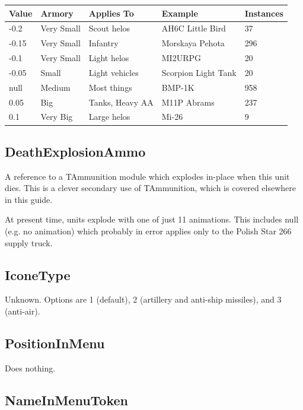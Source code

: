 \documentclass{article}
\begin{document}
\begin{center}
    \begin{tabular}{ | l | l | l | l | l |}
    \hline
	Value & Armory & Applies To & Example & Instances \\ \hline
	-0.2  &  Very Small & Scout helos & AH6C Little Bird  & 37\\
	-0.15 & Very Small & Infantry & Morskaya Pehota & 296 \\
	-0.1 & Very Small & Light helos & MI2URPG & 20 \\
	-0.05 & Small & Light vehicles & Scorpion Light Tank & 20\\
	null & Medium & Most things & BMP-1K & 958 \\
	0.05 & Big & Tanks, Heavy AA & M11P Abrams & 237\\
	0.1 & Very Big & Large helos & Mi-26 & 9\\	
    \hline
    \end{tabular}
\end{center}

\subsection{DeathExplosionAmmo}

A reference to a TAmmunition module which explodes in-place when this unit dies. This is a clever secondary use of TAmmunition, which is covered elsewhere in this guide.

At present time, units explode with one of just 11 animations. This includes null (e.g. no animation) which probably in error applies only to the Polish Star 266 supply truck.

\subsection{IconeType}

Unknown. Options are 1 (default), 2 (artillery and anti-ship missiles), and 3 (anti-air).

\subsection{PositionInMenu}

Does nothing.

\subsection{NameInMenuToken}
\end{document}
